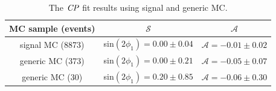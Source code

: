 \begin{table}
	\centering
	\caption{The $\it{CP}$ fit results using signal and generic MC.}
	\label{tab:cpfit_result_mc}
\begin{tabular}{|c|c|c|}
	\hline
	MC sample (events)& $\mathcal{S}$ &  $\mathcal{A}$\\
	\hline
	signal MC (8873) & sin$(2\phi_1) = 0.00 \pm 0.04 $ &  $\mathcal{A} = -0.01 \pm 0.02$\\
	\hline
	generic MC (373) &  sin$(2\phi_1)  = 0.00 \pm 0.21$ & $\mathcal{A}  = -0.05 \pm 0.07$ \\
	\hline
	generic MC (30) & sin$(2\phi_1) = 0.20 \pm 0.85 $& $\mathcal{A} = -0.06 \pm 0.30$ \\
	\hline
\end{tabular}
\end{table}

